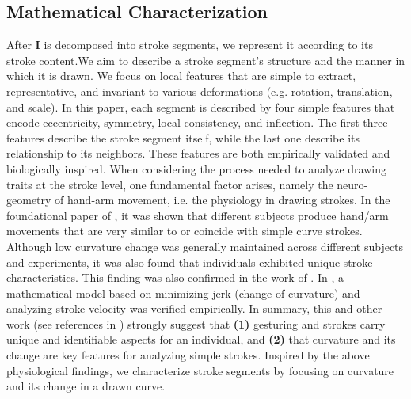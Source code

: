 
\vspace{-4mm}
\subsection{Mathematical Characterization} \label{subsec: featureExtraction}
\vspace{-1mm}
After $\mathbf{I}$ is decomposed into stroke segments, we represent it according to its stroke content.We aim to describe a stroke segment's structure and the manner in which it is drawn. We focus on local features that are simple to extract, representative, and invariant to various deformations (e.g. rotation, translation, and scale). In this paper, each segment is described by four simple features that encode eccentricity, symmetry, local consistency, and inflection. The first three features describe the stroke segment itself, while the last one describe its relationship to its neighbors. These features are both empirically validated and biologically inspired. When considering the process needed to analyze drawing traits at the stroke level, one fundamental factor arises, namely the neuro-geometry of hand-arm movement, i.e. the physiology in drawing strokes. In the foundational paper of  \cite{morasso1981spatial}, it was shown that different subjects produce hand/arm movements that are very similar to or coincide with simple curve strokes. Although low curvature change was generally maintained across different subjects and experiments, it was also found that individuals exhibited unique stroke characteristics. This finding was also confirmed in the work of  \cite{abend1982human}. In \cite{flash1985coordination}, a mathematical model based on minimizing jerk (change of curvature) and analyzing stroke velocity was verified empirically. In summary, this and other work (see references in \cite{flash1985coordination}) strongly suggest that \textbf{(1)} gesturing and strokes carry unique and identifiable aspects for an individual, and \textbf{(2)} that curvature and its change are key features for analyzing simple strokes. Inspired by the above physiological findings, we characterize stroke segments by focusing on curvature and its change in a drawn curve.

